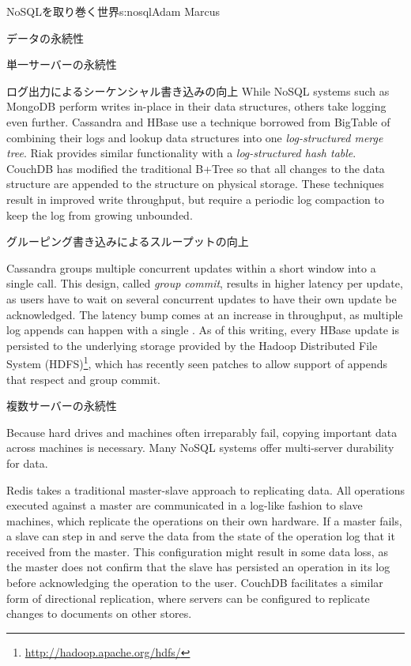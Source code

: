 \begin{aosachapter}{NoSQLを取り巻く世界}{s:nosql}{Adam Marcus}
\begin{aosasect1}{データの永続性}
\begin{aosasect2}{単一サーバーの永続性}
\begin{aosasect3}{ログ出力によるシーケンシャル書き込みの向上}
While NoSQL systems such as MongoDB perform writes in-place in their
data structures, others take logging even further.  Cassandra and
HBase use a technique borrowed from BigTable of combining their logs
and lookup data structures into one \emph{log-structured merge tree}.
Riak provides similar functionality with a \emph{log-structured hash
table}.  CouchDB has modified the traditional B+Tree so that all
changes to the data structure are appended to the structure on
physical storage.  These techniques result in improved write
throughput, but require a periodic log compaction to keep the log from
growing unbounded.

\end{aosasect3}

\begin{aosasect3}{グルーピング書き込みによるスループットの向上}

Cassandra groups multiple concurrent updates within a short window
into a single  call.  This design, called \emph{group
commit}, results in higher latency per update, as users have to wait
on several concurrent updates to have their own update be
acknowledged.  The latency bump comes at an increase in throughput, as
multiple log appends can happen with a single .  As of
this writing, every HBase update is persisted to the underlying
storage provided by the Hadoop Distributed File System
(HDFS)\footnote{\url{http://hadoop.apache.org/hdfs/}}, which has
recently seen patches to allow support of appends that respect
 and group commit.

\end{aosasect3}

\end{aosasect2}

\begin{aosasect2}{複数サーバーの永続性}

Because hard drives and machines often irreparably fail, copying
important data across machines is necessary.  Many NoSQL systems offer
multi-server durability for data.

Redis takes a traditional master-slave approach to replicating data.
All operations executed against a master are communicated in a
log-like fashion to slave machines, which replicate the operations on
their own hardware.  If a master fails, a slave can step in and serve
the data from the state of the operation log that it received from the
master.  This configuration might result in some data loss, as the
master does not confirm that the slave has persisted an operation in
its log before acknowledging the operation to the user.  CouchDB
facilitates a similar form of directional replication, where servers
can be configured to replicate changes to documents on other stores.


\end{aosasect2}
\end{aosasect1}
\end{aosachapter}
